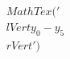 \documentclass[preview]{standalone}
\begin{document}
\begin{align*}
MathTex('\\lVert y_0 - y_5 \\rVert')
\end{align*}
\end{document}

